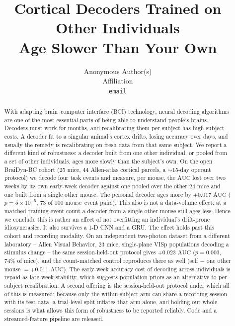 \documentclass{article}
\title{Cortical Decoders Trained on Other Individuals\\
Age Slower Than Your Own}
\author{%
  Anonymous Author(s)\\
  Affiliation\\
  \texttt{email}\\
}
\newcommand{\auc}{\mathrm{AUC}}
\begin{document}
\maketitle

\begin{abstract}
With adapting brain--computer interface (BCI) technology, neural decoding algorithms are one of the
most essential parts of being able to understand people's brains. Decoders must work for months, and
recalibrating them per subject has high subject costs. A decoder fit to a singular animal's cortex
drifts, losing accuracy over days, and usually the remedy is recalibrating on fresh data from that
same subject. We report a different kind of robustness: a
decoder built from one other individual, or pooled from a set of other individuals, ages more slowly
than the subject's own. On the open BraiDyn-BC cohort (25 mice, 44 Allen-atlas cortical parcels, a
$\sim$15-day operant protocol) we decode four task events and measure, per mouse, the $\auc$ lost
over two weeks by its own early-week decoder against one pooled over the other 24 mice and one built
from a single other mouse. The personal decoder ages more by $+0.017$ $\auc$
($p = 5 \times 10^{-5}$, 73 of 100 mouse--event pairs). This also is not a data-volume effect: at a matched training-event count a
decoder from a single other mouse still ages less. Hence we conclude this is rather an effect of not
overfitting an individual's drift-prone idiosyncrasies. It also survives a 1-D CNN and a GRU. The
effect holds past this cohort and recording modality. On an independent two-photon dataset from a
different laboratory -- Allen Visual Behavior, 23 mice, single-plane VISp populations decoding a
stimulus change -- the same session-held-out protocol gives $+0.023$ $\auc$
($p = 0.003$, 74\% of mice), and the count-matched control reproduces there as well
(self $-$ one other mouse $= +0.011$ $\auc$). The
early-week accuracy cost of decoding across individuals is repaid as late-week stability, which
suggests population priors as an alternative to per-subject recalibration. A second offering is the
session-held-out protocol under which all of this is measured: because only the within-subject arm
can share a recording session with its test data, a trial-level split inflates that arm alone, and
holding out whole sessions is what allows this form of robustness to be reported reliably. Code and
a streamed-feature pipeline are released.
\end{abstract}
\end{document}
